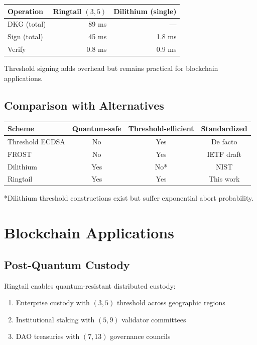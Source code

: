 \documentclass[11pt,a4paper]{article}
\begin{document}
\begin{center}
\begin{tabular}{|l|r|r|}
\hline
\textbf{Operation} & \textbf{Ringtail $(3,5)$} & \textbf{Dilithium (single)} \\
\hline
DKG (total) & 89 ms & --- \\
Sign (total) & 45 ms & 1.8 ms \\
Verify & 0.8 ms & 0.9 ms \\
\hline
\end{tabular}
\end{center}

Threshold signing adds overhead but remains practical for blockchain applications.

\subsection{Comparison with Alternatives}

\begin{center}
\begin{tabular}{|l|c|c|c|}
\hline
\textbf{Scheme} & \textbf{Quantum-safe} & \textbf{Threshold-efficient} & \textbf{Standardized} \\
\hline
Threshold ECDSA & No & Yes & De facto \\
FROST & No & Yes & IETF draft \\
Dilithium & Yes & No* & NIST \\
Ringtail & Yes & Yes & This work \\
\hline
\end{tabular}
\end{center}

*Dilithium threshold constructions exist but suffer exponential abort probability.

\section{Blockchain Applications}

\subsection{Post-Quantum Custody}

Ringtail enables quantum-resistant distributed custody:
\begin{enumerate}
    \item Enterprise custody with $(3,5)$ threshold across geographic regions
    \item Institutional staking with $(5,9)$ validator committees
    \item DAO treasuries with $(7,13)$ governance councils
\end{enumerate}
\end{document}
